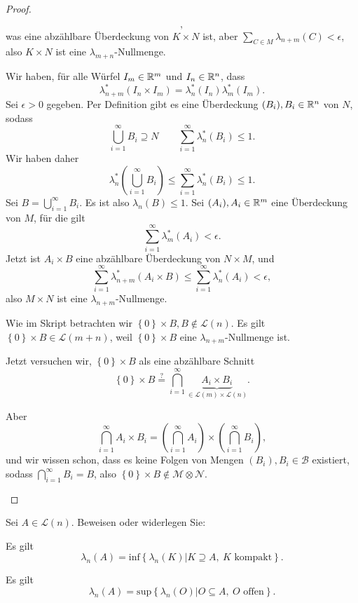 \begin{proof}
\begin{parts}
\[		,\]
		was eine abzählbare Überdeckung von $K\times N$ ist, aber $\sum_{C\in M}\lambda_{n+m}(C)<\epsilon$, also $K\times N$ ist eine $\lambda_{m+n}$-Nullmenge.
	\item Wir haben, f\"{u}r alle Würfel $I_m\in \mathbb{R}^m$ und $I_n\in \mathbb{R}^n$, dass
		\[
			\lambda_{n+m}^*(I_n\times I_m) =\lambda_n^*(I_n)\lambda_m^*(I_m)
		.\] 
	Sei $\epsilon>0$ gegeben. Per Definition gibt es eine Überdeckung $(B_i),B_i\in \mathbb{R}^n$ von $N$, sodass
	\[
	\bigcup_{i=1} ^\infty B_i\supseteq N\qquad \sum_{i=1}^{\infty} \lambda_n^*(B_i)\le 1
	.\] 
	Wir haben daher
\[
\lambda_n^*\left( \bigcup_{i=1} ^\infty B_i \right) \le \sum_{i=1}^{\infty} \lambda_n^*(B_i)\le 1
.\] 
Sei $B=\bigcup_{i=1}^\infty B_i$. Es ist also $\lambda_n(B)\le 1$. Sei $(A_i),A_i\in \mathbb{R}^m$ eine Überdeckung von $M$, f\"{u}r die gilt
	\[
	\sum_{i=1}^{\infty} \lambda_m^*(A_i)<\epsilon
	.\] 
	Jetzt ist $A_i\times B$ eine abzählbare Überdeckung von $N\times M$, und
	\[
		\sum_{i=1}^\infty\lambda_{n+m}^*(A_i\times B)\le \sum_{i=1}^\infty \lambda_n^*(A_i)<\epsilon
	,\]
	also $M\times N$ ist eine $\lambda_{n+m}$-Nullmenge.
\item Wie im Skript betrachten wir $\left\{ 0 \right\} \times B, B\not\in  \mathcal{L}(n)$. Es gilt $\left\{ 0 \right\} \times B\in \mathcal{L}(m+n)$, weil $\left\{ 0 \right\} \times B$ eine $\lambda_{n+m}$-Nullmenge ist.

	Jetzt versuchen wir, $\left\{ 0 \right\} \times B$ als eine abzählbare Schnitt
	\[
		\left\{ 0 \right\} \times B\overset{?}{=}\bigcap_{i=1}^\infty \underbrace{A_i\times B_i}_{\in \mathcal{L}(m)\times \mathcal{L}(n)}
	.\] 

	Aber
	\[
	\bigcap_{i=1}^\infty A_i\times B_i=\left( \bigcap_{i=1} ^\infty A_i \right) \times \left(\bigcap_{i=1}^\infty B_i\right)
	,\] 
	und wir wissen schon, dass es keine Folgen von Mengen $(B_i),B_i\in \mathcal{B}$ existiert, sodass $\bigcap_{i=1}^\infty B_i=B$, also $\left\{ 0 \right\} \times B\not\in \mathcal{M}\otimes \mathcal{N}$.\qedhere
	\end{parts}
\end{proof}
\begin{Problem}
	Sei $A\in \mathcal{L}(n)$. Beweisen oder widerlegen Sie:
	\begin{parts}
	\item Es gilt
		\[
			\lambda_n(A)=\text{inf}\left\{ \lambda_n(K)|K\supseteq A,~K\text{ kompakt} \right\} 
		.\] 
	\item Es gilt
		\[
			\lambda_n(A)=\text{sup}\left\{ \lambda_n(O)|O\subseteq A,~O\text{ offen} \right\} 
		.\] 
	\end{parts}
\end{Problem}
